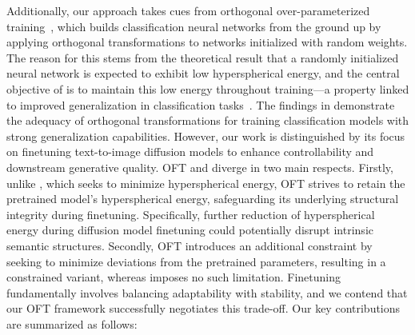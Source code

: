 Additionally, our approach takes cues from orthogonal over-parameterized training~\cite{liu2021orthogonal}, which builds classification neural networks from the ground up by applying orthogonal transformations to networks initialized with random weights. The reason for this stems from the theoretical result that a randomly initialized neural network is expected to exhibit low hyperspherical energy, and the central objective of \cite{liu2021orthogonal} is to maintain this low energy throughout training—a property linked to improved generalization in classification tasks~\cite{liu2018learning,lin2020regularizing}. The findings in \cite{liu2021orthogonal} demonstrate the adequacy of orthogonal transformations for training classification models with strong generalization capabilities. However, our work is distinguished by its focus on finetuning text-to-image diffusion models to enhance controllability and downstream generative quality. OFT and \cite{liu2021orthogonal} diverge in two main respects. Firstly, unlike \cite{liu2021orthogonal}, which seeks to minimize hyperspherical energy, OFT strives to retain the pretrained model’s hyperspherical energy, safeguarding its underlying structural integrity during finetuning. Specifically, further reduction of hyperspherical energy during diffusion model finetuning could potentially disrupt intrinsic semantic structures. Secondly, OFT introduces an additional constraint by seeking to minimize deviations from the pretrained parameters, resulting in a constrained variant, whereas \cite{liu2021orthogonal} imposes no such limitation. Finetuning fundamentally involves balancing adaptability with stability, and we contend that our OFT framework successfully negotiates this trade-off. Our key contributions are summarized as follows:

